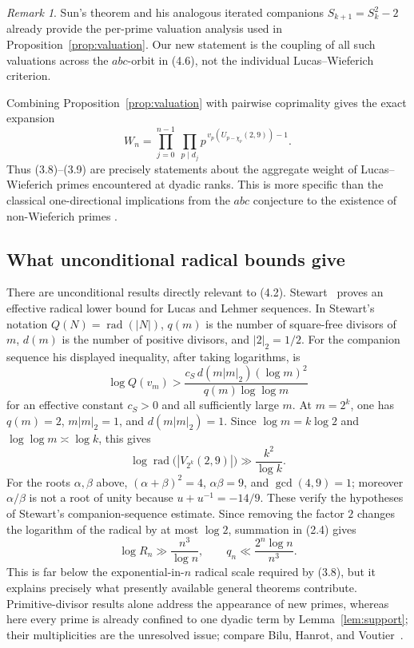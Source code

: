 \documentclass[11pt]{article}
\theoremstyle{remark}
\newtheorem{remark}[theorem]{Remark}
\newcommand{\rad}{\operatorname{rad}}
\begin{document}
\begin{remark}
Sun's theorem and his analogous iterated companions
\(S_{k+1}=S_k^2-2\) already provide the per-prime valuation analysis
used in Proposition~\ref{prop:valuation}.  Our new statement is the
coupling of all such valuations across the \(abc\)-orbit in (4.6), not
the individual Lucas--Wieferich criterion.
\end{remark}

Combining Proposition~\ref{prop:valuation} with pairwise coprimality
gives the exact expansion
\[
 \boxed{\quad
 W_n=\prod_{j=0}^{n-1}\ \prod_{p\mid d_j}
 p^{\,v_p(U_{p-\chi_p}(2,9))-1}.
 \quad}                                                    \tag{4.6}
\]
Thus (3.8)--(3.9) are precisely statements about the aggregate weight of
Lucas--Wieferich primes encountered at dyadic ranks.  This is more
specific than the classical one-directional implications from the
\(abc\) conjecture to the existence of non-Wieferich primes
\cite{Silverman1988,RibenboimWalsh1999,Yabuta2007}.

\subsection{What unconditional radical bounds give}

There are unconditional results directly relevant to (4.2).
Stewart~\cite[Theorem~1]{Stewart1983} proves an effective radical lower
bound for Lucas and Lehmer sequences.  In Stewart's notation
\(Q(N)=\rad(|N|)\), \(q(m)\) is the number of square-free divisors of
\(m\), \(d(m)\) is the number of positive divisors, and \(|2|_2=1/2\).
For the companion sequence his displayed inequality, after taking
logarithms, is
\[
 \log Q(v_m)>
 \frac{c_{\!S}\,d(m|m|_2)(\log m)^2}
      {q(m)\log\log m}
\]
for an effective constant \(c_{\!S}>0\) and all sufficiently large
\(m\).  At \(m=2^k\), one has \(q(m)=2\), \(m|m|_2=1\), and
\(d(m|m|_2)=1\).  Since \(\log m=k\log2\) and
\(\log\log m\asymp\log k\), this gives
\[
 \log\rad\bigl(|V_{2^k}(2,9)|\bigr)
 \gg \frac{k^2}{\log k}.                                  \tag{4.7}
\]
For the roots \(\alpha,\beta\) above,
\((\alpha+\beta)^2=4\), \(\alpha\beta=9\), and
\(\gcd(4,9)=1\); moreover \(\alpha/\beta\) is not a root of unity
because \(u+u^{-1}=-14/9\).  These verify the hypotheses of Stewart's
companion-sequence estimate.
Since removing the factor \(2\) changes the logarithm of the radical by
at most \(\log2\), summation in (2.4) gives
\[
 \log R_n\gg\frac{n^3}{\log n},\qquad
 q_n\ll\frac{2^n\log n}{n^3}.                             \tag{4.8}
\]
This is far below the exponential-in-\(n\) radical scale required by
(3.8), but it explains precisely what presently available general
theorems contribute.  Primitive-divisor results alone address the
appearance of new primes, whereas here every prime is already confined
to one dyadic term by Lemma~\ref{lem:support}; their multiplicities are
the unresolved issue; compare Bilu, Hanrot, and
Voutier~\cite{BiluHanrotVoutier2001}.
\end{document}
